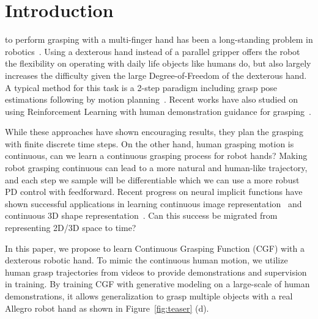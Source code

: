 \documentclass[letterpaper, 10 pt, journal, twoside]{IEEEtran}
\begin{document}
\IEEEpeerreviewmaketitle

\section{Introduction}
\label{sec:introduction}

 to perform grasping with a multi-finger hand has been a long-standing problem in robotics~\cite{salisbury1982articulated,rus1999hand,okamura2000overview,Dogar2010}. Using a dexterous hand instead of a parallel gripper offers the robot the flexibility on operating with daily life objects like humans do, but also largely increases the difficulty given the large Degree-of-Freedom of the dexterous hand. A typical method for this task is a 2-step paradigm including grasp pose estimations following by motion planning~\cite{varley2015generating,brahmbhatt2019contactgrasp,lu2020planning}. Recent works have also studied on using Reinforcement Learning with human demonstration guidance for grasping~\cite{mandikal2021learning,qin2021dexmv}.

While these approaches have shown encouraging results, they plan the grasping with finite discrete time steps. On the other hand, human grasping motion is continuous, can we learn a continuous grasping process for robot hands? Making robot grasping continuous can lead to a more natural and human-like trajectory, and each step we sample will be differentiable which we can use a more robust PD control with feedforward. Recent progress on neural implicit functions have shown successful applications in learning continuous image representation~\cite{chen2021learning,dupont2021generative} and continuous 3D shape representation~\cite{park2019deepsdf,mescheder2019occupancy,mildenhall2020nerf}. Can this success be migrated from representing 2D/3D space to time?

In this paper, we propose to learn Continuous Grasping Function (CGF) with a dexterous robotic hand. To mimic the continuous human motion, we utilize human grasp trajectories from videos to provide demonstrations and supervision in training. By training CGF with generative modeling on a large-scale of human demonstrations, it allows generalization to grasp multiple objects with a real Allegro robot hand as shown in Figure~\ref{fig:teaser} (d).
\end{document}
